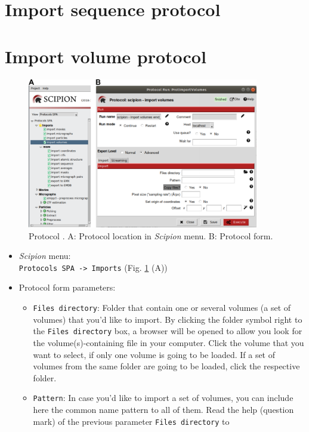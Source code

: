 \documentclass[12pt]{article} %
\newcommand{\ffigure}[1]{{Fig. {\ref{#1}}}\xspace}
\newcommand{\scommand}[1]{{{\keys{#1}}}\xspace}
\def\scipion{\textit{Scipion}\xspace}
\newcommand{\ttt}[1]{\texttt{#1}}
\begin{document}
\begin{appendices}
\section{Import sequence protocol}
\label{app:importSequence}

\section{Import volume protocol}
\label{app:importVolume}

\begin{figure}[H]
    \centering 
    \captionsetup{width=.7\linewidth} 
    \includegraphics[width=0.90\textwidth]{Images_appendix/Fig100}
    \caption{Protocol \scommand{import volumes}. A: Protocol location in \scipion menu. B: Protocol form.}
    \label{fig:app_protocol_volume_1}
   \end{figure}
   
 \begin{itemize}
  \item \scipion menu:\\
  \ttt{Protocols SPA -> Imports} (\ffigure{fig:app_protocol_volume_1} (A))\\
  
  \item Protocol form parameters:\\
  \begin{itemize}
   \item \ttt{Files directory}: Folder that contain one or several volumes (a set of volumes) that you'd like to import. By clicking the folder symbol right to the \ttt{Files directory} box, a browser will be opened to allow you look for the volume(s)-containing file in your computer. Click the volume that you want to select, if only one volume is going to be loaded. If a set of volumes from the same folder are going to be loaded, click the respective folder.\\
   \item \ttt{Pattern}: In case you'd like to import a set of volumes, you can include here the common name pattern to all of them. Read the help (question mark) of the previous parameter \ttt{Files directory} to 
   

\end{itemize}
\end{itemize}
\end{appendices}
\end{document}
